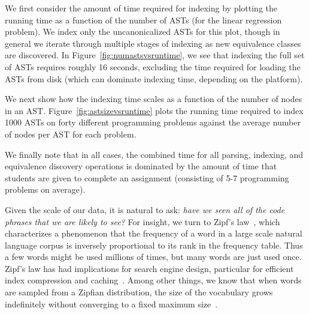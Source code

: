 We first consider the amount of time required for indexing 
by plotting the running time 
 as a function of the number of ASTs (for the linear regression problem).
We index only the uncanonicalized ASTs for this plot, though in general we iterate through multiple stages of indexing
as new equivalence classes are discovered.
In Figure~\ref{fig:numastsvsruntime}, we see that indexing the full set of ASTs requires roughly 16 seconds, excluding the time required for loading the ASTs 
from disk (which can dominate indexing time, depending on the platform).  

We next show how the indexing time scales as a function of the number of nodes in an AST.
Figure~\ref{fig:astsizevsruntime} plots the running time required to index 1000 ASTs 
on forty different programming problems against the average number of nodes per AST for each problem.


We finally note that in all cases, the combined time for all parsing, indexing, and equivalence discovery operations
is dominated by the amount of time that students are given to complete an assignment (consisting of 5-7 programming problems on average).

Given the scale of our data, it is natural to ask:  \emph{have we seen all of the code phrases that we are likely to see?}
For insight, we turn to Zipf's law~\cite{zipf1949human}, which characterizes a phenomenon that
 the frequency of a word in a large scale natural language corpus
is inversely proportional to its rank in the frequency table. 
Thus a few words might be used millions of times,
but many words are just used once. 
Zipf's law has had implications for search engine design, particular for efficient index compression and caching~\cite{breslau99}.
Among other things, we know that when words are sampled from a Zipfian distribution, the size of the vocabulary grows
indefinitely without converging to a fixed maximum size~\cite{lu10}.

